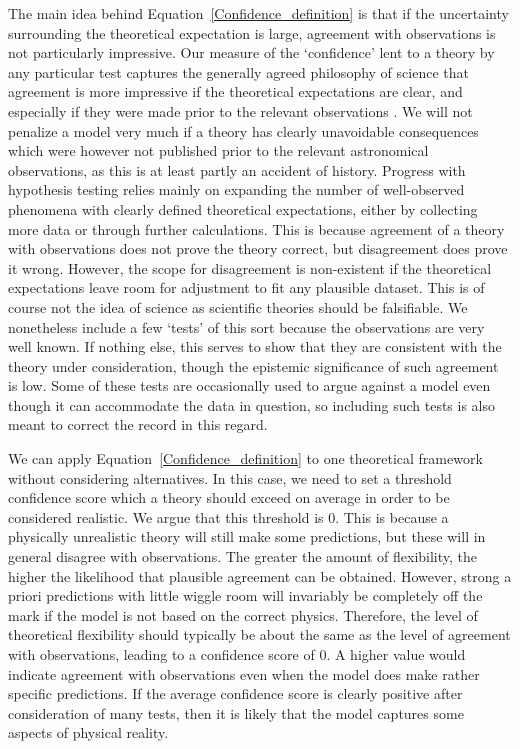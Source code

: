 \documentclass[fleqn,usenatbib,useAMS]{mnras} %
\begin{document}
The main idea behind Equation~\ref{Confidence_definition} is that if the uncertainty surrounding the theoretical expectation is large, agreement with observations is not particularly impressive. Our measure of the `confidence' lent to a theory by any particular test captures the generally agreed philosophy of science that agreement is more impressive if the theoretical expectations are clear, and especially if they were made prior to the relevant observations \citep{Merritt_2020}. We will not penalize a model very much if a theory has clearly unavoidable consequences which were however not published prior to the relevant astronomical observations, as this is at least partly an accident of history. Progress with hypothesis testing relies mainly on expanding the number of well-observed phenomena with clearly defined theoretical expectations, either by collecting more data or through further calculations. This is because agreement of a theory with observations does not prove the theory correct, but disagreement does prove it wrong. However, the scope for disagreement is non-existent if the theoretical expectations leave room for adjustment to fit any plausible dataset. This is of course not the idea of science as scientific theories should be falsifiable. We nonetheless include a few `tests' of this sort because the observations are very well known. If nothing else, this serves to show that they are consistent with the theory under consideration, though the epistemic significance of such agreement is low. Some of these tests are occasionally used to argue against a model even though it can accommodate the data in question, so including such tests is also meant to correct the record in this regard.

We can apply Equation~\ref{Confidence_definition} to one theoretical framework without considering alternatives. In this case, we need to set a threshold confidence score which a theory should exceed on average in order to be considered realistic. We argue that this threshold is 0. This is because a physically unrealistic theory will still make some predictions, but these will in general disagree with observations. The greater the amount of flexibility, the higher the likelihood that plausible agreement can be obtained. However, strong a priori predictions with little wiggle room will invariably be completely off the mark if the model is not based on the correct physics. Therefore, the level of theoretical flexibility should typically be about the same as the level of agreement with observations, leading to a confidence score of 0. A higher value would indicate agreement with observations even when the model does make rather specific predictions. If the average confidence score is clearly positive after consideration of many tests, then it is likely that the model captures some aspects of physical reality.
\end{document}
